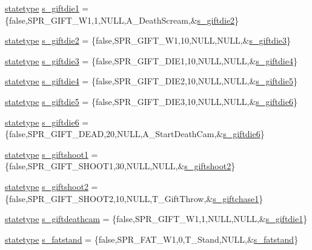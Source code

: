 \begin{DoxyCompactItemize}
\hyperlink{structstatestruct}{statetype} \hyperlink{WL__ACT2_8C_a8ade14a52fd1d56ac5956d318e3d7261}{s\_\-giftdie1} = \{false,SPR\_\-GIFT\_\-W1,1,NULL,A\_\-DeathScream,\&\hyperlink{WL__ACT2_8C_a34d251ff8e929298fe05a6d85eaf6bd6}{s\_\-giftdie2}\}
\item 
\hyperlink{structstatestruct}{statetype} \hyperlink{WL__ACT2_8C_a34d251ff8e929298fe05a6d85eaf6bd6}{s\_\-giftdie2} = \{false,SPR\_\-GIFT\_\-W1,10,NULL,NULL,\&\hyperlink{WL__ACT2_8C_a91242714b9b95d199688bfcd64cc28a0}{s\_\-giftdie3}\}
\item 
\hyperlink{structstatestruct}{statetype} \hyperlink{WL__ACT2_8C_a91242714b9b95d199688bfcd64cc28a0}{s\_\-giftdie3} = \{false,SPR\_\-GIFT\_\-DIE1,10,NULL,NULL,\&\hyperlink{WL__ACT2_8C_a098d4de348bb27933dd912e540f12dc8}{s\_\-giftdie4}\}
\item 
\hyperlink{structstatestruct}{statetype} \hyperlink{WL__ACT2_8C_a098d4de348bb27933dd912e540f12dc8}{s\_\-giftdie4} = \{false,SPR\_\-GIFT\_\-DIE2,10,NULL,NULL,\&\hyperlink{WL__ACT2_8C_ae6f8e4ed029fb6484ffcb166beed76c3}{s\_\-giftdie5}\}
\item 
\hyperlink{structstatestruct}{statetype} \hyperlink{WL__ACT2_8C_ae6f8e4ed029fb6484ffcb166beed76c3}{s\_\-giftdie5} = \{false,SPR\_\-GIFT\_\-DIE3,10,NULL,NULL,\&\hyperlink{WL__ACT2_8C_a42ba26ddb8a99b9acba9da4f7ee59a3b}{s\_\-giftdie6}\}
\item 
\hyperlink{structstatestruct}{statetype} \hyperlink{WL__ACT2_8C_a42ba26ddb8a99b9acba9da4f7ee59a3b}{s\_\-giftdie6} = \{false,SPR\_\-GIFT\_\-DEAD,20,NULL,A\_\-StartDeathCam,\&\hyperlink{WL__ACT2_8C_a42ba26ddb8a99b9acba9da4f7ee59a3b}{s\_\-giftdie6}\}
\item 
\hyperlink{structstatestruct}{statetype} \hyperlink{WL__ACT2_8C_ad9108b8c8f5c7451a5025f1f7372b0ef}{s\_\-giftshoot1} = \{false,SPR\_\-GIFT\_\-SHOOT1,30,NULL,NULL,\&\hyperlink{WL__ACT2_8C_a5014213e30afa37b5bfd50bbd77a2a38}{s\_\-giftshoot2}\}
\item 
\hyperlink{structstatestruct}{statetype} \hyperlink{WL__ACT2_8C_a5014213e30afa37b5bfd50bbd77a2a38}{s\_\-giftshoot2} = \{false,SPR\_\-GIFT\_\-SHOOT2,10,NULL,T\_\-GiftThrow,\&\hyperlink{WL__DEF_8H_a0a40f8197d12177d3e313cbed430ed05}{s\_\-giftchase1}\}
\item 
\hyperlink{structstatestruct}{statetype} \hyperlink{WL__ACT2_8C_a5d7b6e22195ea183c784aaea1ccee2b3}{s\_\-giftdeathcam} = \{false,SPR\_\-GIFT\_\-W1,1,NULL,NULL,\&\hyperlink{WL__DEF_8H_a8ade14a52fd1d56ac5956d318e3d7261}{s\_\-giftdie1}\}
\item 
\hyperlink{structstatestruct}{statetype} \hyperlink{WL__ACT2_8C_a983e58a59fd14d69865e570041327ce1}{s\_\-fatstand} = \{false,SPR\_\-FAT\_\-W1,0,T\_\-Stand,NULL,\&\hyperlink{WL__ACT2_8C_a983e58a59fd14d69865e570041327ce1}{s\_\-fatstand}\}

\end{DoxyCompactItemize}
